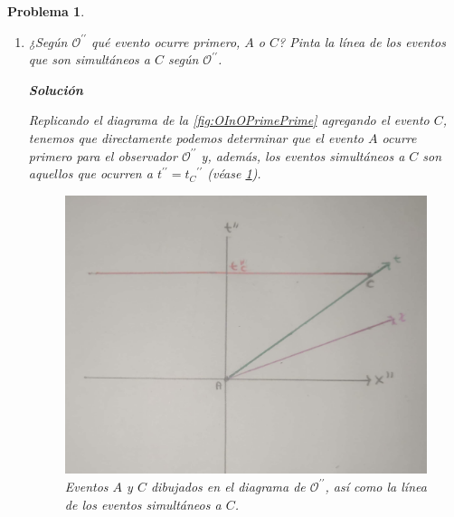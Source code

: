 \documentclass[12pt]{article}
\theoremstyle{break}
\newtheorem{exercise}{Problema}
\theoremstyle{nonumberbreak}
\newcommand*{\biprimeobserver}{\mathcal{O}^{\prime\prime}}
\newcommand*{\inlinesol}{\vspace*{10pt}\textbf{Solución}\vspace*{10pt}}
\begin{document}
\begin{exercise}
\begin{enumerate}[label = \alph*)]
            \pagebreak
            \item ¿Según \(\biprimeobserver\) qué evento ocurre primero, \(A\) o \(C\)? Pinta la línea de los eventos que son simultáneos a \(C\) según \(\biprimeobserver\).
            
            \inlinesol

            Replicando el diagrama de la \cref{fig:OInOPrimePrime} agregando el evento \(C\), tenemos que directamente podemos determinar que el evento \(A\) ocurre primero para el observador \(\biprimeobserver\) y, además, los eventos simultáneos a \(C\) son aquellos que ocurren a \(t^{\prime\prime} = {t_{C}}^{\prime\prime}\) (véase \cref{fig:ACInOPrimePrime}).

            \begin{figure}[htb]
                \centering
                \includegraphics[scale = 0.15]{fig-2.7.pdf}
                \caption{Eventos \(A\) y \(C\) dibujados en el diagrama de \(\biprimeobserver\), así como la línea de los eventos simultáneos a \(C\).}
                \label{fig:ACInOPrimePrime}
            \end{figure}
        \end{enumerate}
    \end{exercise}
\end{document}
